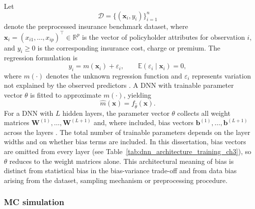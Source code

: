 Let
\begin{equation}
\label{eq:dataset}
    \mathcal{D}
    =
    \{(\mathbf{x}_i,y_i)\}_{i=1}^{n}
\end{equation}
denote the preprocessed insurance benchmark dataset, where
\(\mathbf{x}_i=(x_{i1},\ldots,x_{ip})^\top\in\mathbb{R}^{p}\) is the vector of
policyholder attributes for observation \(i\), and \(y_i\geq 0\) is the
corresponding insurance cost, charge or premium. The regression formulation is
\begin{equation}
\label{eq:regression}
    y_i
    =
    m(\mathbf{x}_i)
    +
    \varepsilon_i,
    \qquad
    \mathbb{E}(\varepsilon_i\mid \mathbf{x}_i)=0,
\end{equation}
where \(m(\cdot)\) denotes the unknown regression function and
\(\varepsilon_i\) represents variation not explained by the observed predictors
\citep{hastie2009elements, james2021introduction}. A DNN with trainable
parameter vector \(\theta\) is fitted to approximate \(m(\cdot)\), yielding
\begin{equation}
\label{eq:fitted_model}
    \widehat{m}(\mathbf{x})
    =
    f_{\widehat{\theta}}(\mathbf{x}).
\end{equation}
For a DNN with \(L\) hidden layers, the parameter vector
\(\theta\) collects all weight matrices
\(\mathbf{W}^{(1)},\ldots,\mathbf{W}^{(L+1)}\) and, where included, bias
vectors \(\mathbf{b}^{(1)},\ldots,\mathbf{b}^{(L+1)}\) across the layers
\citep{goodfellow2016deep}. The total number of trainable parameters depends
on the layer widths and on whether bias terms are included. In this
dissertation, bias vectors are omitted from every layer
(see Table~\ref{tab:dnn_architecture_training_ch3}), so \(\theta\) reduces
to the weight matrices alone. This architectural meaning of bias is
distinct from statistical bias in the bias-variance trade-off
\citep{hastie2009elements} and from data bias arising from the dataset,
sampling mechanism or preprocessing procedure.

\subsubsection{MC simulation}
\label{montecarlo_propagation}

